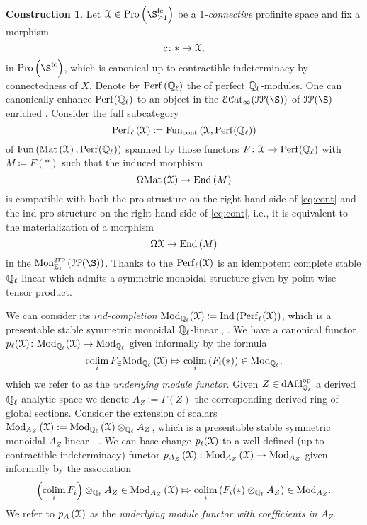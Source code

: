 \documentclass[10pt,a4paper]{amsart}
\numberwithin{equation}{subsection}
\theoremstyle{plain}
\theoremstyle{definition}
\newtheorem{construction}[theorem]{Construction}
\theoremstyle{remark}
\numberwithin{equation}{section}
\begin{document}
\begin{construction} \label{const:mod}
Let $\mathcal{X} \in \pro \left( \S_{\geq 1}^{\fc} \right)$ be a \emph{$1$-connective} profinite space and fix a morphism
	\[
		c \colon * \to \mathcal X,
	\]
in  $\pro \left( \S^{\fc} \right)$, which is canonical up to contractible indeterminacy by connectedness of $X$.
Denote by $\mathrm{Perf} \left( \mathbb{Q}_{\ell} \right)$ the \infcat of perfect $\mathbb{Q}_{\ell}$-modules. One can canonically enhance $\mathrm{Perf}(\mathbb{Q}_{\ell})$ to an object in the \infcat $\cE \Cat (\cI \cP(\S))$ of $\cI \cP (\S)$-enriched \infcats. Consider the full subcategory	
	\[
		\mathrm{Perf}_{\ell} \left( \mathcal X \right) \coloneqq \mathrm{Fun}_{\mathrm{cont}} \left( \mathcal X, \mathrm{Perf}(\mathbb{Q}_{\ell} ) \right)
	\]
of $\mathrm{Fun} \left( \mathrm{Mat} \left( \mathcal X \right) , \mathrm{Perf}( \mathbb{Q}_{\ell} ) \right)$ spanned by those functors $F \colon \mathcal X \to \mathrm{Perf}( \mathbb{Q}_{\ell})$ with $M \coloneqq F(*)$ such that the induced morphism
	\begin{equation} \label{eq:cont}
		\Omega \mathrm{Mat} \left(  \mathcal X \right) \to \mathrm{End} \left( M \right)
	\end{equation}
is compatible with both the pro-structure on the right hand side of \eqref{eq:cont} and the ind-pro-structure on the right hand side of \eqref{eq:cont}, i.e., it is equivalent to the materialization of a morphism
	\[
		\Omega \mathcal X \to \mathrm{End} \left( M \right)
	\]
in the \infcat $\Mon^{\grp}_{\mathbb E_1} \left( \cI \cP (\S) \right)$. Thanks to \cite[Corollary 4.3.23]{me1} the \infcat
$\mathrm{Perf}_\ell(\mathcal X)$ is an idempotent complete stable $\mathbb{Q}_{\ell}$-linear \infcat which
admits a symmetric monoidal structure given by point-wise tensor product.

We can consider its \emph{ind-completion} $\mathrm{Mod}_{\mathbb{Q}_{\ell}}(\mathcal X) \coloneqq \mathrm{Ind} \left(\mathrm{Perf}_\ell(\mathcal X)  \right)$, which is a presentable stable symmetric monoidal
$\mathbb{Q}_\ell$-linear \infcat, \cite[Corollary 4.3.25]{me1}. We have a canonical functor $p_{\ell} ( \mathcal X ) \colon \mathrm{Mod}_{\mathbb{Q}_\ell} (\mathcal X) \to \mathrm{Mod}_{\mathbb{Q}_\ell}$ given informally by the formula
	\[
		\operatorname*{colim}_i F_\in \mathrm{Mod}_{\mathbb{Q}_\ell} \left( \mathcal X \right) \Mapsto \operatorname*{colim}_i \left( F_i(*)  \right) \in \mathrm{Mod}_{\mathbb{Q}_\ell},
	\]
which we refer to as the \emph{underlying module functor}.
Given $Z \in \mathrm{dAfd}_{\mathbb{Q}_\ell}^{\mathrm{op}}$ a derived $\mathbb{Q}_{\ell}$-analytic space we denote
$A_Z := \Gamma \left( Z \right)$ the corresponding derived ring of global sections. Consider the extension of scalars \infcat $\mathrm{Mod}_{A_Z} \left( \mathcal X \right) := \mathrm{Mod}_{\mathbb{Q}_{\ell}} \left( \mathcal X \right) \otimes_{\mathbb{Q}_\ell} A_Z$, which is a presentable stable symmetric
monoidal $A_Z$-linear \infcat, \cite[Corollary 4.3.25]{me1}. We can base change $p_\ell (\mathcal X)$ to a well defined  (up to contractible indeterminacy) functor $ p_{A_Z} \left( \mathcal X \right)  \colon \mathrm{Mod}_{A_Z} \left( \mathcal X \right) \to \mathrm{Mod}_{A_Z}$ given informally by the
association
	\[
		\left( \operatorname*{colim}_i F_i \right) \otimes_{\mathbb{Q}_{\ell}} A_Z \in \mathrm{Mod}_{A_Z} \left( \mathcal X \right) \Mapsto \operatorname*{colim}_i \left( F_i(*) \otimes_{\mathbb{Q}_\ell} A_Z \right) \in \mathrm{Mod}_{A_Z}.
	\]
We refer to $p_A \left( \mathcal X \right)$ as the \emph{underlying module functor with coefficients in $A_Z$}.
\end{construction}
\end{document}

